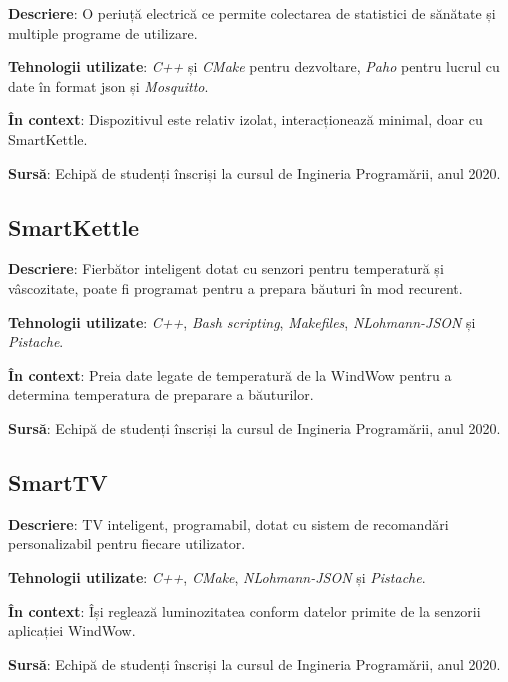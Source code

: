 \textbf{Descriere}: O periuță electrică ce permite colectarea de statistici de sănătate și multiple programe de utilizare.

\textbf{Tehnologii utilizate}: \textit{C++} și \textit{CMake} pentru dezvoltare, \textit{Paho} pentru lucrul cu date în format \acrshort{json} și \textit{Mosquitto}.

\textbf{În context}: Dispozitivul este relativ izolat, interacționează minimal, doar cu SmartKettle.

\textbf{Sursă}: Echipă de studenți înscriși la cursul de Ingineria Programării, anul 2020.

\subsection*{SmartKettle}

\textbf{Descriere}: Fierbător inteligent dotat cu senzori pentru temperatură și vâscozitate, poate fi programat pentru a prepara băuturi în mod recurent.

\textbf{Tehnologii utilizate}: \textit{C++}, \textit{Bash scripting}, \textit{Makefiles}, \textit{NLohmann-JSON} și \textit{Pistache}.

\textbf{În context}: Preia date legate de temperatură de la WindWow pentru a determina temperatura de preparare a băuturilor.

\textbf{Sursă}: Echipă de studenți înscriși la cursul de Ingineria Programării, anul 2020.

\subsection*{SmartTV}

\textbf{Descriere}: TV inteligent, programabil, dotat cu sistem de recomandări personalizabil pentru fiecare utilizator.

\textbf{Tehnologii utilizate}: \textit{C++}, \textit{CMake}, \textit{NLohmann-JSON} și \textit{Pistache}.

\textbf{În context}: Își reglează luminozitatea conform datelor primite de la senzorii aplicației WindWow.

\textbf{Sursă}: Echipă de studenți înscriși la cursul de Ingineria Programării, anul 2020.

